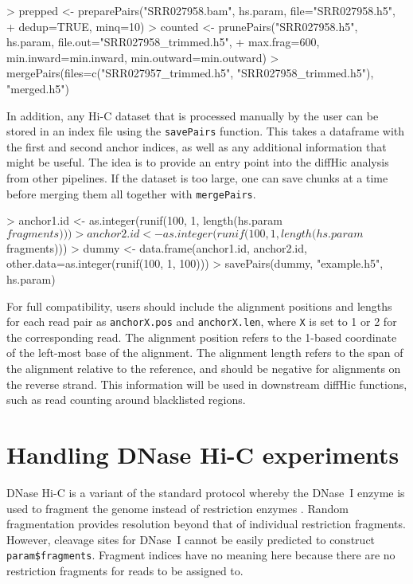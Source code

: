 \documentclass[12pt]{report}
\renewenvironment{Schunk}{\vspace{0pt}}{\vspace{0pt}}
\newcommand{\pkgname}{diffHic}
\newcommand{\code}[1]{{\small\texttt{#1}}}
\begin{document}
\begin{Schunk}
\begin{Sinput}
> prepped <- preparePairs("SRR027958.bam", hs.param, file="SRR027958.h5", 
+     dedup=TRUE, minq=10)
> counted <- prunePairs("SRR027958.h5", hs.param, file.out="SRR027958_trimmed.h5", 
+     max.frag=600, min.inward=min.inward, min.outward=min.outward)
> mergePairs(files=c("SRR027957_trimmed.h5", "SRR027958_trimmed.h5"), "merged.h5")
\end{Sinput}
\end{Schunk}

In addition, any Hi-C dataset that is processed manually by the user can be stored in an index file using the \code{savePairs} function.
This takes a dataframe with the first and second anchor indices, as well as any additional information that might be useful.
The idea is to provide an entry point into the \pkgname{} analysis from other pipelines.
If the dataset is too large, one can save chunks at a time before merging them all together with \code{mergePairs}.

\begin{Schunk}
\begin{Sinput}
> anchor1.id <- as.integer(runif(100, 1, length(hs.param$fragments)))
> anchor2.id <- as.integer(runif(100, 1, length(hs.param$fragments)))
> dummy <- data.frame(anchor1.id, anchor2.id, other.data=as.integer(runif(100, 1, 100)))
> savePairs(dummy, "example.h5", hs.param)
\end{Sinput}
\end{Schunk}

For full compatibility, users should include the alignment positions and lengths for each read pair as \code{anchorX.pos} and \code{anchorX.len},
    where \code{X} is set to 1 or 2 for the corresponding read.
The alignment position refers to the 1-based coordinate of the left-most base of the alignment.
The alignment length refers to the span of the alignment relative to the reference, and should be negative for alignments on the reverse strand.
This information will be used in downstream \pkgname{} functions, such as read counting around blacklisted regions.

\section{Handling DNase Hi-C experiments}
DNase Hi-C is a variant of the standard protocol whereby the DNase~I enzyme is used to fragment the genome instead of restriction enzymes \citep{ma2015dnase}.
Random fragmentation provides resolution beyond that of individual restriction fragments.
However, cleavage sites for DNase~I cannot be easily predicted to construct \code{param\$fragments}.
Fragment indices have no meaning here because there are no restriction fragments for reads to be assigned to.
\end{document}
